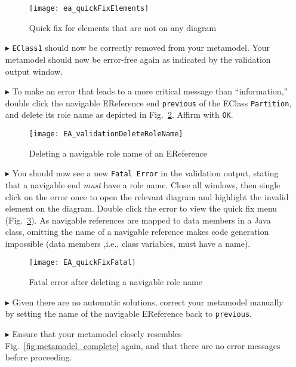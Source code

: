 \begin{enumerate}
\begin{figure}[htbp]
	\centering
  \texttt{[image: ea\_quickFixElements]}
	\caption{Quick fix for elements that are not on any diagram}
	\label{fig:quick-fix1}
\end{figure}
\FloatBarrier

\vspace{0.5cm}

\item[$\blacktriangleright$] \texttt{EClass1} should now be correctly removed from your metamodel. Your metamodel should now be error-free again as indicated by
the validation output window.

\item[$\blacktriangleright$] To make an error that leads to a more critical message than ``information,'' double click the navigable EReference end
\texttt{previous} of the EClass \texttt{Partition}, and delete its role name as depicted in Fig.~\ref{fig:delete-role-name}. Affirm with \texttt{OK}.

\begin{figure}[htbp]
    \centering
  \texttt{[image: EA\_validationDeleteRoleName]}
    \caption{Deleting a navigable role name of an EReference}
    \label{fig:delete-role-name}
\end{figure}

\item[$\blacktriangleright$] You should now see a new \texttt{Fatal Error} in the validation output, stating that a navigable end \emph{must} have a role name.
Close all windows, then single click on the error once to open the relevant diagram and highlight the invalid element on the diagram. Double click the error to
view the quick fix menu (Fig.~\ref{fig:fatal-error}). As navigable references are mapped to data members in a Java class, omitting the name of a navigable
reference makes code generation impossible (data members ,i.e., class variables, must have a name).

\begin{figure}[htbp]
	\centering
  \texttt{[image: EA\_quickFixFatal]}
	\caption{Fatal error after deleting a navigable role name}
	\label{fig:fatal-error}
\end{figure}

\item[$\blacktriangleright$] Given there are no automatic solutions, correct your metamodel manually by setting the name of the navigable EReference back to
\texttt{previous}.

\item[$\blacktriangleright$] Ensure that your metamodel closely resembles Fig.~\ref{fig:metamodel_complete} again, and that there are no error messages before
proceeding.
\end{enumerate}

